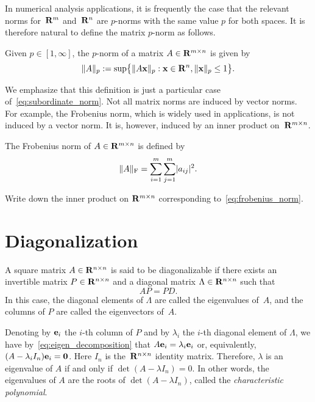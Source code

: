 In numerical analysis applications,
it is frequently the case that the relevant norms for~$\mathbf R^m$ and~$\mathbf R^n$ are $p$-norms with the same value $p$ for both spaces.
It is therefore natural to define the matrix $p$-norm as follows.
\begin{definition}
Given $p \in [1, \infty]$,
the $p$-norm of a matrix $A \in \mathbf R^{m\times n}$ is given by
\begin{equation}
    \label{eq:matrix_p_norm}
    \lVert A\rVert_{p} := \sup \bigl\{ \lVert A \mathbf x\rVert_{p} : \mathbf x \in \mathbf R^n, \lVert\mathbf x\rVert_{p} \leq 1 \bigr\}.
\end{equation}
\end{definition}
We emphasize that this definition is just a particular case of~\eqref{eq:subordinate_norm}.
Not all matrix norms are induced by vector norms.
For example, the Frobenius norm,
which is widely used in applications,
is not induced by a vector norm.
It is, however, induced by an inner product on~$\mathbf R^{m \times n}$.
\begin{definition}
    The Frobenius norm of $A \in \mathbf R^{m\times n}$ is defined by
    \begin{equation}
        \label{eq:frobenius_norm}
        \lVert A\rVert_{\rm F} = \sum_{i=1}^{m} \sum_{j=1}^{m} \lvert a_{ij}\rvert^2.
    \end{equation}
\end{definition}
\begin{exercise}
    Write down the inner product on $\mathbf R^{m \times n}$ corresponding to~\eqref{eq:frobenius_norm}.
\end{exercise}

\section{Diagonalization}%
\label{sec:diagonalization}

\begin{definition}
    A square matrix $A \in \mathbf R^{n \times n}$ is said to be diagonalizable if there exists an invertible matrix $P \in \mathbf R^{n \times n}$
    and a diagonal matrix $\Lambda \in \mathbf R^{n \times n}$ such that
    \begin{equation}
        \label{eq:eigen_decomposition}
        A P = P D.
    \end{equation}
    In this case,
    the diagonal elements of $\Lambda$ are called the eigenvalues of~$A$,
    and the columns of $P$ are called the eigenvectors of~$A$.
\end{definition}
Denoting by $\mathbf e_i$ the $i$-th column of $P$ and by $\lambda_i$ the $i$-th diagonal element of $\Lambda$,
we have by~\eqref{eq:eigen_decomposition} that $A \mathbf e_i = \lambda_i \mathbf e_i$ or,
equivalently, $(A - \lambda_i I_n) \mathbf e_i = \mathbf 0$. Here $I_n$ is the~$\mathbf R^{n \times n}$ identity matrix.
Therefore, $\lambda$ is an eigenvalue of $A$ if and only if $\det(A - \lambda I_n) = 0$.
In other words, the eigenvalues of $A$ are the roots of $\det(A - \lambda I_n)$,
called the \emph{characteristic polynomial}.

